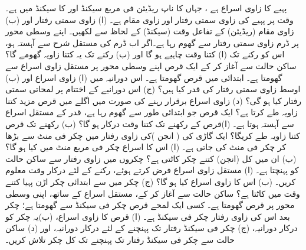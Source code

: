 پہیے کا زاوی اسراع  ہے ، جہاں  کا ناپ  ریڈیئن فی مربع سیکنڈ اور  کا سیکنڈ میں ہے۔ وقت  پر پہیے کی زاوی سمتی
 رفتار  اور زاوی مقام  ہے۔ (ا) زاوی سمتی رفتار    اور (ب) زاوی مقام (ریڈیئن)  کے  تفاعل وقت (سیکنڈ)  کے لحاظ سے لکھیں۔
اپنے وسطی محور پر  ڈرم  زاوی سمتی رفتار سے گھوم رہا ہے۔اگر  اب ڈرم  کی  مستقل شرح سے آہستہ ہو، اس کو رکنے تک  (ا) کتنا وقت چاہیے ہو گا اور (ب) رکنے تک یہ کتنا زاویہ گھومے گا؟
ساکن حالت سے آغاز کر کے ایک قرص اپنے وسطی محور  پر مستقل زاوی اسراع سے گھومتا ہے۔ ابتدائی  میں قرص  گھومتا ہے۔ اس دورانیہ میں (ا) زاوی اسراع اور (ب) اوسط زاوی سمتی رفتار کی قدر کیا ہیں؟ (ج)  اس   دورانیے کے اختتام پر لمحاتی سمتی رفتار  کیا ہو گی؟ (د)   زاوی اسراع برقرار رہنے کی صورت میں اگلے  میں قرص مزید  کتنا  زاویہ طے کرتا ہے؟
ایک قرص جو ابتدائی طور  سے گھوم رہا ہے،  قدر کے مستقل اسراع سے آہستہ ہوتا ہے۔ (ا)قرص کے  رکھنے  تک کتنا وقت  درکار ہو گا؟  (ب)   رکھنے تک قرص کتنا زاویہ طے کریگا؟
ایک گاڑی کی ( انجن )کی زاوی رفتار  میں   چکر فی منٹ سے بڑھا کر  چکر فی منٹ کی جاتی ہے۔ (ا)  اس کا اسراع چکر فی مربع  منٹ میں کیا ہو گا؟ (ب) ان  میں کل (انجن) کتنے چکر کاٹتی ہے؟
       چکروں میں    زاوی رفتار  سے  ساکن حالت کو پہنچتا ہے۔ (ا)  مستقل زاوی اسراع فرض کرتے ہوئے، رکنے کے لئے درکار وقت معلوم کریں۔ (ب)  اس کا زاوی اسراع کیا ہو گا؟ (ج)   چکر میں سے ابتدائی  چکر  اڑن پہیا کتنے  وقت میں کاٹتا ہے؟
ساکن حالت سے آغاز کر کے،   مستقل اسراع کے ساتھ، اپنی وسطی محور پر  قرص گھومتا ہے۔ کسی ایک لمحے قرص   چکر فی سیکنڈ سے گھومتا ہے؛  چکر بعد اس کی زاوی رفتار  چکر فی سیکنڈ ہے۔ (ا) قرص کا زاوی اسراع، (ب)یہ      چکر کو درکار دورانیہ، (ج)   چکر فی سیکنڈ رفتار تک پہنچنے  کے لئے درکار دورانیہ، اور (د)  ساکن حالت سے  چکر فی سیکنڈ رفتار تک پہنچنے تک کل چکر تلاش کریں۔
